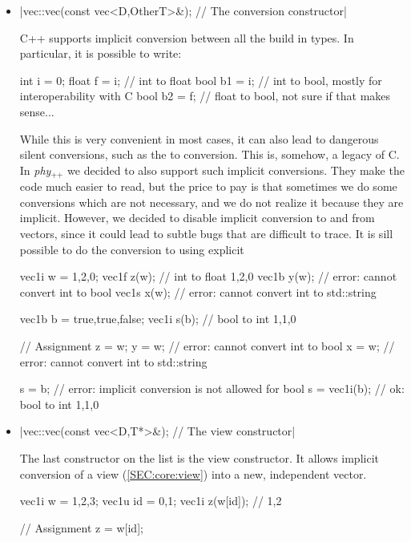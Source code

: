 \documentclass[12pt]{report}
\newcommand{\phypp}{\textit{phy}$_{\text{++}}$\xspace}
\newenvironment{example}
{
    \begin{mdframed}[style=example,frametitle={Example}]
}
{
    \end{mdframed}
}
\begin{document}
\begin{itemize}
\item \cppinline|vec::vec(const vec<D,OtherT>&); // The conversion constructor|

C++ supports implicit conversion between all the build in types. In particular, it is possible to write:
\begin{cppcode}
int i = 0;
float f = i; // int to float
bool b1 = i; // int to bool, mostly for interoperability with C
bool b2 = f; // float to bool, not sure if that makes sense...
\end{cppcode}
While this is very convenient in most cases, it can also lead to dangerous silent conversions, such as the  to  conversion. This is, somehow, a legacy of C. In \phypp we decided to also support such implicit conversions. They make the code much easier to read, but the price to pay is that sometimes we do some conversions which are not necessary, and we do not realize it because they are implicit. However, we decided to disable implicit conversion to and from  vectors, since it could lead to subtle bugs that are difficult to trace. It is sill possible to do the conversion to  using explicit

\begin{example}
\begin{cppcode}
vec1i w = {1,2,0};
vec1f z(w); // int to float {1,2,0}
vec1b y(w); // error: cannot convert int to bool
vec1s x(w); // error: cannot convert int to std::string

vec1b b = {true,true,false};
vec1i s(b); // bool to int {1,1,0}

// Assignment
z = w;
y = w;        // error: cannot convert int to bool
x = w;        // error: cannot convert int to std::string

s = b;        // error: implicit conversion is not allowed for bool
s = vec1i(b); // ok: bool to int {1,1,0}
\end{cppcode}
\end{example}

\item \cppinline|vec::vec(const vec<D,T*>&); // The view constructor|

The last constructor on the list is the view constructor. It allows implicit conversion of a view (\ref{SEC:core:view}) into a new, independent vector.

\begin{example}
\begin{cppcode}
vec1i w = {1,2,3};
vec1u id = {0,1};
vec1i z(w[id]); // {1,2}

// Assignment
z = w[id];
\end{cppcode}
\end{example}

\end{itemize}
\end{document}
